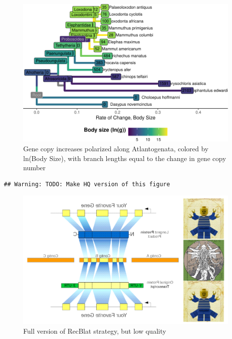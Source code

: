 \documentclass[]{elsarticle} %
\begin{document}
\begin{figure}

\includegraphics[width=6in]{paper_PLOS_draft_files/figure-latex/Figure-GeneDup-BLScaled-1} \hfill{}

\caption{Gene copy increases polarized along Atlantogenata, colored by ln(Body Size), with branch lengths equal to the change in gene copy number}\label{fig:Figure-GeneDup-BLScaled}
\end{figure}

\begin{verbatim}
## Warning: TODO: Make HQ version of this figure
\end{verbatim}

\begin{figure}

\includegraphics[width=6in]{paper_PLOS_draft_files/figure-latex/Figure-RBHBStrategy-1} \hfill{}

\caption{Full version of RecBlat strategy, but low quality}\label{fig:Figure-RBHBStrategy}
\end{figure}
\end{document}

